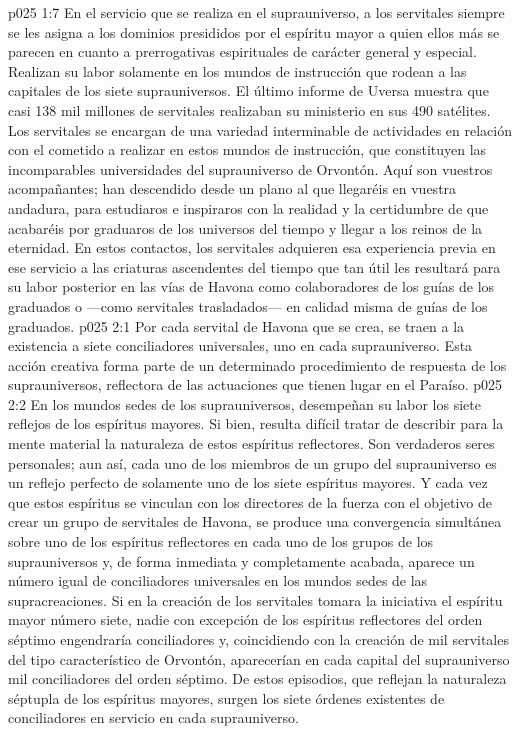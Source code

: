 \vs p025 1:7 En el servicio que se realiza en el suprauniverso, a los servitales siempre se les asigna a los dominios presididos por el espíritu mayor a quien ellos más se parecen en cuanto a prerrogativas espirituales de carácter general y especial. Realizan su labor solamente en los mundos de instrucción que rodean a las capitales de los siete suprauniversos. El último informe de Uversa muestra que casi 138 mil millones de servitales realizaban su ministerio en sus 490 satélites. Los servitales se encargan de una variedad interminable de actividades en relación con el cometido a realizar en estos mundos de instrucción, que constituyen las incomparables universidades del suprauniverso de Orvontón. Aquí son vuestros acompañantes; han descendido desde un plano al que llegaréis en vuestra andadura, para estudiaros e inspiraros con la realidad y la certidumbre de que acabaréis por graduaros de los universos del tiempo y llegar a los reinos de la eternidad. En estos contactos, los servitales adquieren esa experiencia previa en ese servicio a las criaturas ascendentes del tiempo que tan útil les resultará para su labor posterior en las vías de Havona como colaboradores de los guías de los graduados o ---como servitales trasladados--- en calidad misma de guías de los graduados.
\vs p025 2:1 Por cada servital de Havona que se crea, se traen a la existencia a siete conciliadores universales, uno en cada suprauniverso. Esta acción creativa forma parte de un determinado procedimiento de respuesta de los suprauniversos, reflectora de las actuaciones que tienen lugar en el Paraíso.
\vs p025 2:2 En los mundos sedes de los suprauniversos, desempeñan su labor los siete reflejos de los espíritus mayores. Si bien, resulta difícil tratar de describir para la mente material la naturaleza de estos espíritus reflectores. Son verdaderos seres personales; aun así, cada uno de los miembros de un grupo del suprauniverso es un reflejo perfecto de solamente uno de los siete espíritus mayores. Y cada vez que estos espíritus se vinculan con los directores de la fuerza con el objetivo de crear un grupo de servitales de Havona, se produce una convergencia simultánea sobre uno de los espíritus reflectores en cada uno de los grupos de los suprauniversos y, de forma inmediata y completamente acabada, aparece un número igual de conciliadores universales en los mundos sedes de las supracreaciones. Si en la creación de los servitales tomara la iniciativa el espíritu mayor número siete, nadie con excepción de los espíritus reflectores del orden séptimo engendraría conciliadores y, coincidiendo con la creación de mil servitales del tipo característico de Orvontón, aparecerían en cada capital del suprauniverso mil conciliadores del orden séptimo. De estos episodios, que reflejan la naturaleza séptupla de los espíritus mayores, surgen los siete órdenes existentes de conciliadores en servicio en cada suprauniverso.

